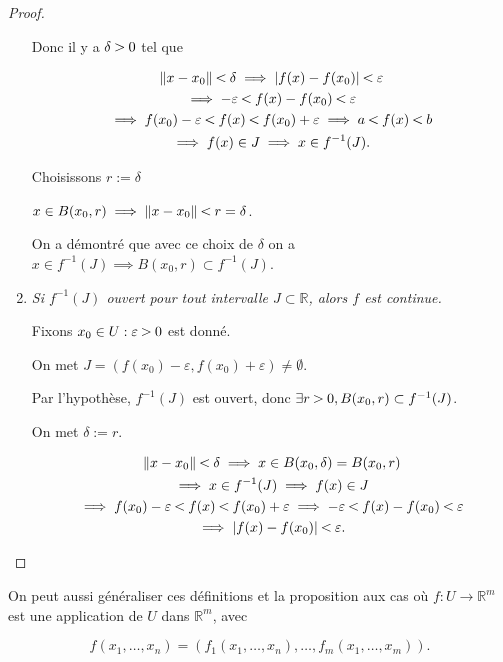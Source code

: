 \documentclass[french]{article}
\newcommand{\lesss}{\rotatebox[origin=c]{90}{$\land$}}
\newcommand{\less}{\ \lesss\ }
\newcommand{\biggg}{\rotatebox[origin=c]{90}{$\lor$}}
\newcommand{\bg}{\ \biggg\ }
\begin{document}
\begin{proof}
\begin{enumerate}
    Donc il y a $\delta \bg 0$ tel que

    \begin{gather*}
      \Vert x-x_0 \Vert \less \delta  \implies \lvert f(x)- f(x_0) \rvert \less \varepsilon \\
      \implies - \varepsilon \less f(x) -f(x_0) \less \varepsilon \\
      \implies f(x_0) - \varepsilon \less f(x) \less f(x_0)+ \varepsilon \implies a \less f(x) \less b \\
      \implies f(x) \in J \implies x \in f ^{-1} (J).
    \end{gather*}

    Choisissons $r := \delta $

    $x \in B(x_0, r) \implies \Vert x-x_0 \Vert \less r=\delta  $.

    On a démontré que avec ce choix de $\delta $ on a $x \in f ^{-1} (J) \implies B(x_0, r) \subset f ^{-1} (J)$.

    \item \emph{Si $f ^{-1} (J)$ ouvert pour tout intervalle $J \subset \mathbb{R}$, alors $f$ est continue.}

    Fixons $x_0 \in U : \varepsilon \bg 0$ est donné.

    On met $J = (f(x_0) - \varepsilon , f(x_0)+ \varepsilon ) \neq \emptyset$.

    Par l'hypothèse, $f ^{-1} (J)$ est ouvert, donc $\exists r \bg 0, B(x_0, r) \subset f ^{-1} (J)$.

    On met $\delta := r$.

    \begin{gather*}
      \Vert x-x_0 \Vert \less \delta \implies x \in B(x_0, \delta ) = B(x_0, r)\\
      \implies x \in f ^{-1} (J) \implies f(x) \in J \\
      \implies f(x_0) - \varepsilon \less f(x) \less f(x_0) + \varepsilon \implies - \varepsilon \less f(x) - f(x_0) \less \varepsilon \\
      \implies \lvert f(x) - f(x_0) \rvert \less \varepsilon .
    \end{gather*}
  \end{enumerate}
\end{proof}

On peut aussi généraliser ces définitions et la proposition aux cas où $f: U \to \mathbb{R}^m$ est une application de $U$ dans $\mathbb{R}^m$, avec

$$ f(x_1, \dots, x_n) = (f_1(x_1, \dots, x_n), \dots, f_m(x_1, \dots, x_m)).$$
\end{document}
